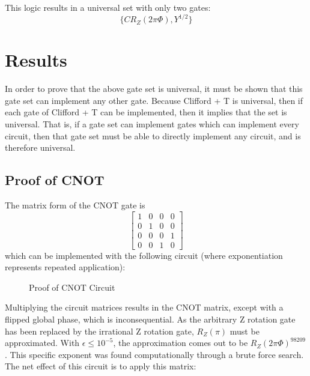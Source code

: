 \documentclass[12pt]{article}
\begin{document}
This logic results in a universal set with only two gates:
$$\{CR_Z(2\pi\Phi), Y^{1/2}\}$$

\section{Results}
In order to prove that the above gate set is universal, it must be shown that this gate set can implement any other gate. Because Clifford + T is universal, then if each gate of Clifford + T can be implemented, then it implies that the set is universal. That is, if a gate set can implement gates which can implement every circuit, then that gate set must be able to directly implement any circuit, and is therefore universal.

\subsection{Proof of CNOT}
The matrix form of the CNOT gate is
$$
\begin{bmatrix}
    1&0&0&0\\
    0&1&0&0\\
    0&0&0&1\\
    0&0&1&0
\end{bmatrix}
$$
which can be implemented with the following circuit (where exponentiation represents repeated application):
\begin{figure}[ht]
    \centering
    \caption{Proof of CNOT Circuit}
    \label{fig:quantum universal set 1 proof of CNOT circuit algebraic}
\end{figure}

Multiplying the circuit matrices results in the CNOT matrix, except with a flipped global phase, which is inconsequential. As the arbitrary Z rotation gate has been replaced by the irrational Z rotation gate, $R_Z(\pi)$ must be approximated. With $\epsilon \le 10^{-5}$, the approximation comes out to be $R_Z(2\pi \Phi)^{98209}$. This specific exponent was found computationally through a brute force search. The net effect of this circuit is to apply this matrix:
\end{document}
